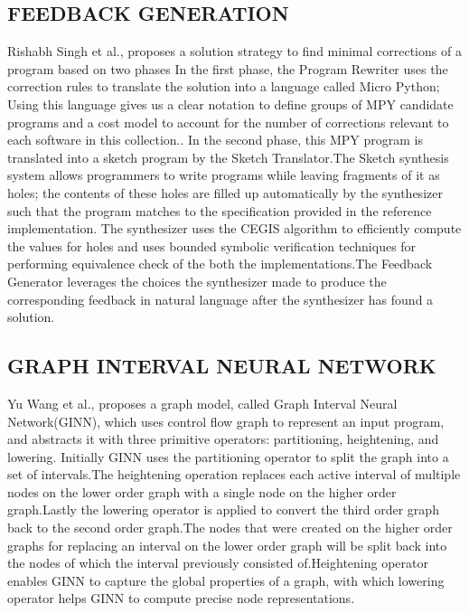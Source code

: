 \subsection{FEEDBACK GENERATION }
Rishabh Singh et al.,\cite{10.1145/2499370.2462195} proposes a solution strategy to find minimal corrections of a program based on two phases In the first phase, the Program Rewriter uses the correction rules to translate the solution into a language called Micro Python; Using this language gives us a clear notation to define groups of MPY candidate programs and a cost model to account for the number of corrections relevant to each software in this collection.. In the second phase, this MPY program is translated into a sketch program by the Sketch Translator.The Sketch synthesis system allows programmers to write programs while leaving fragments of it  as holes; the contents of these holes are filled up automatically by the synthesizer such that the program matches to the specification provided in the reference implementation. The synthesizer uses the CEGIS algorithm to efficiently compute the values for holes and uses bounded symbolic verification techniques for performing equivalence check of the both the implementations.The Feedback Generator leverages the choices the synthesizer made to produce the corresponding feedback in natural language after the synthesizer has found a solution.
\subsection{GRAPH INTERVAL NEURAL NETWORK}
Yu Wang et al.,\cite{10.1145/3428205} proposes a  graph model, called Graph
Interval Neural Network(GINN), which uses control flow graph to represent an input program, and
abstracts it with three primitive operators: partitioning, heightening, and lowering. Initially GINN uses the partitioning operator to split the graph into a set of intervals.The heightening operation replaces each active interval of multiple nodes on the lower order graph with a single node on the higher order graph.Lastly the lowering operator is applied to convert the third order graph back to the second order graph.The nodes that were created on the higher order graphs for replacing an interval on the lower order graph will be split back into the nodes of which the interval previously consisted of.Heightening operator enables GINN to capture the global properties of a graph, with which lowering operator helps GINN to compute
precise node representations.
